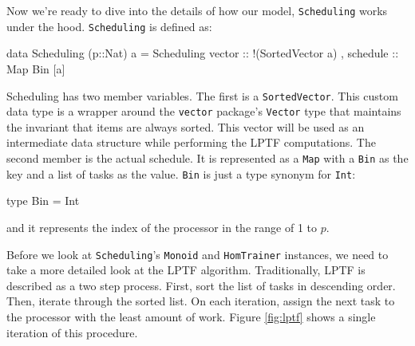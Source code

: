 \documentclass[tikz]{tmr}
\newcommand\h{\lstinline}
\newcommand\+{\mdoubleplus}
\begin{document}
Now we're ready to dive into the details of how our model, \h{Scheduling} works under the hood.
\h{Scheduling} is defined as:
\begin{spec}
data Scheduling (p::Nat) a = Scheduling
    { vector   :: !(SortedVector a)
    , schedule :: Map Bin [a]
    }
\end{spec}
Scheduling has two member variables.
The first is a \h{SortedVector}. 
This custom data type is a wrapper around the \h{vector} package's \h{Vector} type that maintains the invariant that items are always sorted.
This vector will be used as an intermediate data structure while performing the LPTF computations.
The second member is the actual schedule.
It is represented as a \h{Map} with a \h{Bin} as the key and a list of tasks as the value.
\h{Bin} is just a type synonym for \h{Int}:
\begin{spec}
type Bin = Int
\end{spec}
and it represents the index of the processor in the range of 1 to $p$.

Before we look at \h{Scheduling}'s \h{Monoid} and \h{HomTrainer} instances, we need to take a more detailed look at the LPTF algorithm.
Traditionally, LPTF is described as a two step process.
First, sort the list of tasks in descending order.
Then, iterate through the sorted list.
On each iteration, assign the next task to the processor with the least amount of work.
Figure \ref{fig:lptf} shows a single iteration of this procedure.
\end{document}
